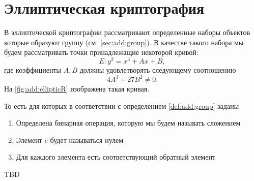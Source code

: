 \section{Эллиптическая криптография}

В эллиптической криптографии рассматривают определенные наборы
объектов которые образуют группу (см. \autoref{sec:add:group}). В
качестве такого набора мы будем рассматривать точки принадлежащие
некоторой кривой: 
\[
E: y^2 = x^3 +A x +B,
\]
где коэффициенты $A,B$ должны удовлетворять следующему соотношению
\[
4 A^3 + 27 B^2 \ne 0.
\]
На \autoref{fig:add:ellipticR} изображена такая кривая.



То
есть для которых в соответствии с определением \ref{def:add:group}
заданы 
\begin{enumerate}
\item Определена бинарная операция, которую мы будем называть сложением
\item Элемент $e$ будет называться нулем
\item Для каждого элемента есть соответствующий обратный элемент
\end{enumerate}
TBD
